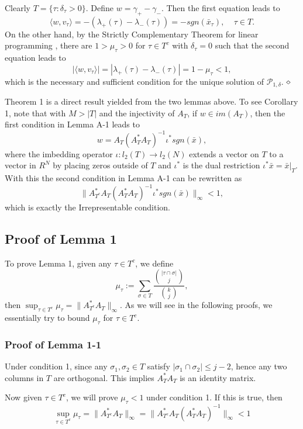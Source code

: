 \documentclass{article}
\begin{document}
Clearly $T = \{ \tau: \delta_\tau > 0\}$. Define $w = \gamma_+ - \gamma_-$. Then the first equation leads to 
\[  \langle w, v_\tau\rangle =  -(\lambda_+(\tau) - \lambda_-(\tau))= -sgn (\bar{x}_\tau), \ \ \ \ \ \tau \in T. \]
On the other hand, by the Strictly Complementary Theorem for linear programming \cite{Ye97}, there are $1>\mu_\tau>0$ for $\tau \in T^c$ with $\delta_\tau = 0$ such that the second equation leads to 
\[ |\langle w, v_\tau \rangle | = |\lambda_+(\tau) - \lambda_-(\tau)| = 1 - \mu_\tau < 1, \]
which is the necessary and sufficient condition for the unique solution of $\mathcal{P}_{1,\delta}$. 
$\hfill\diamond$

Theorem 1 is a direct result yielded from the two lemmas above. To see Corollary 1, note that with $M>|T|$ and the injectivity of $A_{T}$, if $w\in im(A_T)$, then the first condition in Lemma A-1 leads to
$$w=A_{T}(A^*_{T} A_{T})^{-1}\iota^* sgn(\bar{x}),$$
where the imbedding operator $\iota: l_2(T) \to l_2(N)$ extends a vector on $T$ to a vector in $R^N$ by placing zeros outside of $T$ and $\iota^*$ is the dual
restriction $\iota^*\bar{x}=\bar{x}|_T$. With this the second condition in Lemma A-1 can be rewritten as
$$\|A^*_{T^c} A_T (A_T^* A_T)^{-1} \iota^*sgn(\bar{x}) \|_\infty <1, $$
which is exactly the Irrepresentable condition.

\subsection{Proof of Lemma 1}

To prove Lemma 1, given any $\tau\in T^c$, we define 
$$\mu_\tau:=\sum_{\sigma\in T}\frac{{|\tau\cap \sigma|\choose j}}{{k\choose j}}, $$
then $\sup_{\tau\in T^c} \mu_\tau=\|A^*_{T^c} A_T\|_\infty$. 
As we will see in the following proofs, we essentially try to bound $\mu_\tau$ for $\tau\in T^c$.

\subsubsection{Proof of Lemma 1-1}

Under condition 1, since any $\sigma_1, \sigma_2\in T$ satisfy $|\sigma_1\cap \sigma_2|
\le j-2$, hence any two columns in $T$ are orthogonal. 
This implies $A^*_TA_T$ is an identity matrix.  

Now given $\tau\in T^c$, we will prove $\mu_\tau<1$ under condition 1. If this
is true, then  $$\sup_{\tau\in T^c} \mu_\tau=\|A^*_{T^c} A_T\|_\infty=
\|A^*_{T^c}A_T (A^*_TA_T)^{-1}\|_\infty<1 $$
\end{document}
